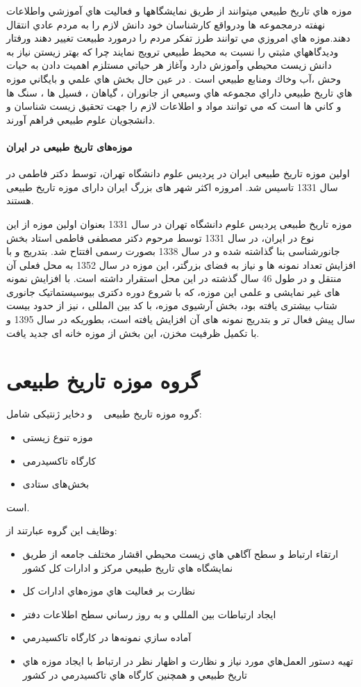 موزه هاي تاريخ طبيعي ميتوانند از طريق نمايشگاهها و فعاليت هاي آموزشي واطلاعات
نهفته درمجموعه ها ودرواقع كارشناسان خود دانش لازم را به مردم عادي انتقال دهند.موزه هاي امروزي مي
توانند طرز تفكر مردم را درمورد طبيعت تغيير دهند ورفتار وديدگاههاي مثبتي را نسبت به محيط طبيعي
ترويج نمايند چرا كه بهتر زيستن نياز به دانش زيست محيطي وآموزش دارد وآغاز هر حياتي مستلزم اهميت
دادن به حيات وحش ،آب وخاك ومنابع طبيعي است . در عين حال بخش هاي علمي و بايگاني موزه هاي تاريخ
طبيعي داراي مجموعه هاي وسيعي از جانوران ، گياهان ، فسيل ها ، سنگ ها و كاني ها است كه مي توانند مواد
و اطلاعات لازم را جهت تحقيق زيست شناسان و دانشجويان علوم طبيعي فراهم آورند.


\paragraph*{موزه‌های تاریخ طبیعی در ایران}

اولین موزه تاریخ طبیعی ایران در پردیس علوم دانشگاه تهران، توسط دکتر فاطمی در سال 1331 تاسیس شد. امروزه اکثر شهر های بزرگ ایران دارای موزه تاریخ طبیعی هستند.

موزه تاریخ طبیعی پردیس علوم دانشگاه تهران در سال 1331 بعنوان اولین موزه از این نوع در ایران، در سال 1331 توسط مرحوم دکتر مصطفی فاطمی استاد بخش جانورشناسی بنا گذاشته شده و در سال 1338 بصورت رسمی افتتاح شد. بتدریج و با افزایش تعداد نمونه ها و نیاز به فضای بزرگتر، این موزه در سال 1352 به محل فعلی آن منتقل و در طول 46 سال گذشته در این محل استقرار داشته است. با افزایش نمونه های غیر نمایشی و علمی این موزه، که با شروع دوره دکتری بیوسیستماتیک جانوری شتاب بیشتری یافته بود، بخش آرشیوی موزه، با کد بین المللی ، نیز از حدود بیست سال پیش فعال تر و بتدریج نمونه های آن افزایش یافته است، بطوریکه در سال 1395 و با تکمیل ظرفیت مخزن، این بخش از موزه خانه ای جدید یافت.

\section{گروه موزه تاریخ طبیعی}
گروه موزه تاریخ طبیعی
~\cite{naturalgroup} و دخایر ژنتیکی شامل:
\begin{itemize}
    \item موزه تنوع زیستی
    \item کارگاه تاکسیدرمی
    \item بخش‌های ستادی
\end{itemize}
است.

وظایف این گروه عبارتند از:

\begin{itemize}
    \item ارتقاء ارتباط و سطح آگاهي هاي زيست محيطي اقشار مختلف جامعه از طريق نمايشگاه
    هاي تاريخ طبيعي مركز و ادارات كل كشور
    \item نظارت بر فعاليت هاي موزه‌هاي ادارات كل
    \item ايجاد ارتباطات بين المللي و به روز رساني سطح اطلاعات دفتر
    \item آماده سازي نمونه‌ها در كارگاه تاكسيدرمي
    \item تهيه دستور العمل‌هاي مورد نياز و نظارت و اظهار نظر در ارتباط با ايجاد موزه هاي تاريخ
    طبيعي و همچنين كارگاه هاي تاكسيدرمي در كشور
\end{itemize}

